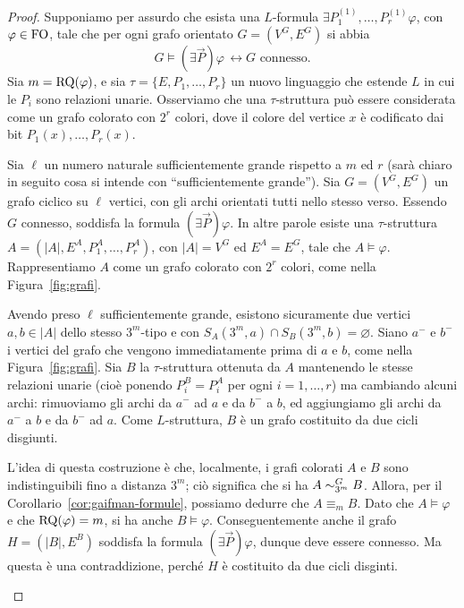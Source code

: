 \begin{proof}
  Supponiamo per assurdo che esista una $L$-formula $\exists P_1^{(1)},\ldots,P_r^{(1)} \varphi$, con $\varphi\in \operatorname{FO}$, tale che per ogni grafo orientato $G=(V^G, E^G)$ si abbia
  \[ G \models (\exists \vec{P}) \varphi \, \leftrightarrow G \text{ connesso}. \]
  Sia $m=\operatorname{RQ}(\varphi)$, e sia $\tau = \{E,P_1,\ldots,P_r\}$ un nuovo linguaggio che estende $L$ in cui le $P_i$ sono relazioni unarie.
  Osserviamo che una $\tau$-struttura può essere considerata come un grafo colorato con $2^r$ colori, dove il colore del vertice $x$ è codificato dai bit $P_1(x),\ldots,P_r(x)$.
  
  Sia $\ell$ un numero naturale sufficientemente grande rispetto a $m$ ed $r$ (sarà chiaro in seguito cosa si intende con ``sufficientemente grande'').
  Sia $G=(V^G, E^G)$ un grafo ciclico su $\ell$ vertici, con gli archi orientati tutti nello stesso verso.
  Essendo $G$ connesso, soddisfa la formula $(\exists\vec{P})\varphi$. In altre parole esiste una $\tau$-struttura $A=(|A|, E^A, P_1^A, \ldots, P_r^A)$, con $|A|=V^G$ ed $E^A = E^G$, tale che $A \models \varphi$.
  Rappresentiamo $A$ come un grafo colorato con $2^r$ colori, come nella Figura~\ref{fig:grafi}.
  
  Avendo preso $\ell$ sufficientemente grande, esistono sicuramente due vertici $a,b\in |A|$ dello stesso $3^m$-tipo e con $S_A(3^m,a) \cap S_B(3^m,b) = \varnothing$.
  Siano $a^-$ e $b^-$ i vertici del grafo che vengono immediatamente prima di $a$ e $b$, come nella Figura~\ref{fig:grafi}.
  Sia $B$ la $\tau$-struttura ottenuta da $A$ mantenendo le stesse relazioni unarie (cioè ponendo $P_i^B = P_i^A$ per ogni $i=1,\dots,r$) ma cambiando alcuni archi: rimuoviamo gli archi da $a^-$ ad $a$ e da $b^-$ a $b$, ed aggiungiamo gli archi da $a^-$ a $b$ e da $b^-$ ad $a$.
  Come $L$-struttura, $B$ è un grafo costituito da due cicli disgiunti.
  
  L'idea di questa costruzione è che, localmente, i grafi colorati $A$ e $B$ sono indistinguibili fino a distanza $3^m$; ciò significa che si ha $A \sim^{G}_{3^m} B$.
  Allora, per il Corollario~\ref{cor:gaifman-formule}, possiamo dedurre che $A \equiv_m B$.
  Dato che $A\models \varphi$ e che $\operatorname{RQ}(\varphi)=m$, si ha anche $B\models \varphi$.
  Conseguentemente anche il grafo $H=(|B|, E^B)$ soddisfa la formula $(\exists \vec{P}) \varphi$, dunque deve essere connesso.
  Ma questa è una contraddizione, perché $H$ è costituito da due cicli disginti.
  
  \begin{figure}[htbp]
    

\end{figure}
\end{proof}
